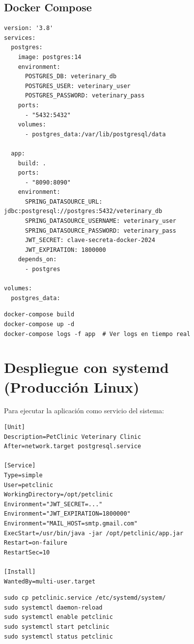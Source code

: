 \subsection{Docker Compose}

\begin{lstlisting}[caption=Docker Compose con PostgreSQL y aplicaci\'on]
version: '3.8'
services:
  postgres:
    image: postgres:14
    environment:
      POSTGRES_DB: veterinary_db
      POSTGRES_USER: veterinary_user
      POSTGRES_PASSWORD: veterinary_pass
    ports:
      - "5432:5432"
    volumes:
      - postgres_data:/var/lib/postgresql/data

  app:
    build: .
    ports:
      - "8090:8090"
    environment:
      SPRING_DATASOURCE_URL: jdbc:postgresql://postgres:5432/veterinary_db
      SPRING_DATASOURCE_USERNAME: veterinary_user
      SPRING_DATASOURCE_PASSWORD: veterinary_pass
      JWT_SECRET: clave-secreta-docker-2024
      JWT_EXPIRATION: 1800000
    depends_on:
      - postgres

volumes:
  postgres_data:
\end{lstlisting}

\begin{lstlisting}[caption=Construir y ejecutar con Docker Compose]
docker-compose build
docker-compose up -d
docker-compose logs -f app  # Ver logs en tiempo real
\end{lstlisting}

\section{Despliegue con systemd (Producci\'on Linux)}

Para ejecutar la aplicaci\'on como servicio del sistema:

\begin{lstlisting}[caption=Archivo de servicio systemd]
[Unit]
Description=PetClinic Veterinary Clinic
After=network.target postgresql.service

[Service]
Type=simple
User=petclinic
WorkingDirectory=/opt/petclinic
Environment="JWT_SECRET=..."
Environment="JWT_EXPIRATION=1800000"
Environment="MAIL_HOST=smtp.gmail.com"
ExecStart=/usr/bin/java -jar /opt/petclinic/app.jar
Restart=on-failure
RestartSec=10

[Install]
WantedBy=multi-user.target
\end{lstlisting}

\begin{lstlisting}[caption=Instalar y gestionar el servicio]
sudo cp petclinic.service /etc/systemd/system/
sudo systemctl daemon-reload
sudo systemctl enable petclinic
sudo systemctl start petclinic
sudo systemctl status petclinic
\end{lstlisting}

